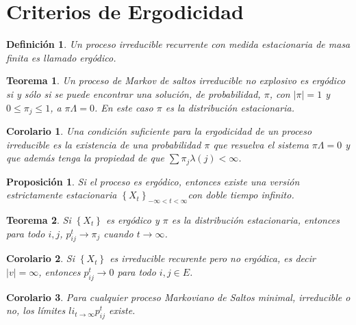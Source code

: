 \documentclass{article}
\newtheorem{Def}{Definición}[section]
\newtheorem{Teo}{Teorema}[section]
\newtheorem{Prop}{Proposición}[section]
\newtheorem{Cor}{Corolario}[section]
\numberwithin{equation}{section}
\begin{document}
\section{Criterios de Ergodicidad}
%

\begin{Def}
Un proceso irreducible recurrente con medida estacionaria de masa finita es llamado erg\'odico.
\end{Def}

\begin{Teo}\label{Teo.4.3}
Un proceso de Markov de saltos irreducible no explosivo es erg\'odico si y s\'olo si se puede encontrar una soluci\'on, de probabilidad, $\pi$, con $|\pi|=1$ y $0\leq\pi_{j}\leq1$, a $\pi\Lambda=0$. En este caso $\pi$ es la distribuci\'on estacionaria.
\end{Teo}

\begin{Cor}\label{Cor.4.4}
Una condici\'on suficiente para la ergodicidad de un proceso irreducible es la existencia de una probabilidad $\pi$ que resuelva el sistema $\pi\Lambda=0$ y que adem\'as tenga la propiedad de que $\sum\pi_{j}\lambda\left(j\right)<\infty$.
\end{Cor}

\begin{Prop}
Si el proceso es erg\'odico, entonces existe una versi\'on estrictamente estacionaria
$\left\{X_{t}\right\}_{-\infty<t<\infty}$con doble tiempo
infinito.
\end{Prop}

\begin{Teo}
Si $\left\{X_{t}\right\}$ es erg\'odico y $\pi$ es la distribuci\'on estacionaria, entonces para todo $i,j$, $p_{ij}^{t}\rightarrow\pi_{j}$ cuando $t\rightarrow\infty$.
\end{Teo}

\begin{Cor}
Si $\left\{X_{t}\right\}$ es irreducible recurente pero no erg\'odica, es decir $|v|=\infty$, entonces $p_{ij}^{t}\rightarrow0$ para todo $i,j\in E$.
\end{Cor}

\begin{Cor}
Para cualquier proceso Markoviano de Saltos minimal, irreducible o
no, los l\'imites $li_{t\rightarrow\infty}p_{ij}^{t}$ existe.
\end{Cor}
\end{document}
